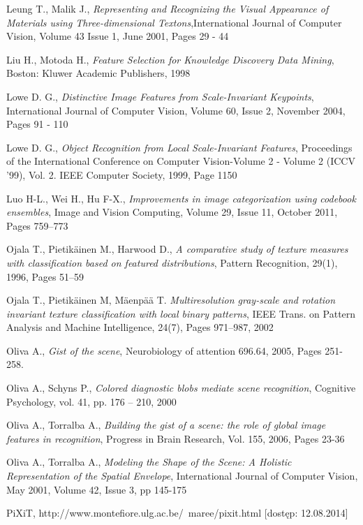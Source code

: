 \begin{thebibliography}{100}
 Leung T., Malik J., \emph{Representing and Recognizing the Visual Appearance of Materials using Three-dimensional Textons},International Journal of Computer Vision, Volume 43 Issue 1, June 2001, Pages 29 - 44 

 Liu H., Motoda H., \emph{Feature Selection for Knowledge Discovery Data Mining}, Boston: Kluwer Academic Publishers, 1998

 Lowe D. G., \emph{Distinctive Image Features from Scale-Invariant Keypoints}, International Journal of Computer Vision, Volume 60, Issue 2, November 2004, Pages 91 - 110 

 Lowe D. G., \emph{Object Recognition from Local Scale-Invariant Features}, Proceedings of the International Conference on Computer Vision-Volume 2 - Volume 2 (ICCV '99), Vol. 2. IEEE Computer Society, 1999, Page 1150

 Luo H-L., Wei H., Hu F-X., \emph{Improvements in image categorization using codebook ensembles}, Image and Vision Computing, Volume 29, Issue 11, October 2011, Pages 759–773

 Ojala T., Pietikäinen M., Harwood D., \emph{A comparative study of texture measures with classification based on featured distributions}, Pattern Recognition, 29(1), 1996, Pages 51–59

 Ojala T., Pietikäinen M, Mäenpää T. \emph{Multiresolution gray-scale and rotation invariant texture classification with local binary patterns}, IEEE Trans. on Pattern Analysis and Machine Intelligence, 24(7), Pages 971–987, 2002

 Oliva A., \emph{Gist of the scene}, Neurobiology of attention 696.64, 2005, Pages 251-258.

 Oliva A., Schyns P., \emph{Colored diagnostic blobs mediate scene recognition}, Cognitive Psychology, vol. 41, pp. 176 – 210, 2000

 Oliva A., Torralba A., \emph{Building the gist of a scene: the role of global image features in recognition}, Progress in Brain Research, Vol. 155, 2006, Pages 23-36

 Oliva A., Torralba A., \emph{Modeling the Shape of the Scene: A Holistic Representation of the Spatial Envelope}, International Journal of Computer Vision, May 2001, Volume 42, Issue 3, pp 145-175

 PiXiT, http://www.montefiore.ulg.ac.be/~maree/pixit.html [dostęp: 12.08.2014]


\end{thebibliography}

